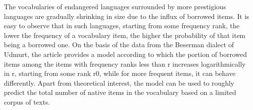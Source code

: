 The vocabularies of endangered languages surrounded by more prestigious languages are gradually shrinking in size due to the influx of borrowed items. It is easy to observe that in such languages, starting from some frequency rank, the lower the frequency of a vocabulary item, the higher the probability of that item being a borrowed one. On the basis of the data from the Beserman dialect of Udmurt, the article provides a model according to which the portion of borrowed items among the items with frequency ranks less than r increases logarithmically in r, starting from some rank r0, while for more frequent items, it can behave differently. Apart from theoretical interest, the model can be used to roughly predict the total number of native items in the vocabulary based on a limited corpus of texts.
